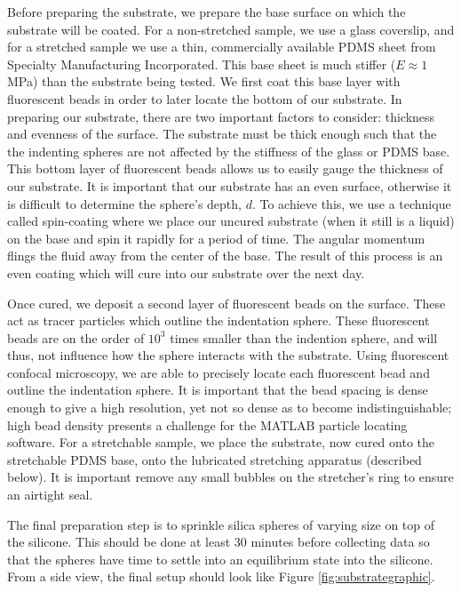 Before preparing the substrate, we prepare the base surface on which the substrate will be coated. For a non-stretched sample, we use a glass coverslip, and for a stretched sample we use a thin, commercially available PDMS sheet from Specialty Manufacturing Incorporated. This base sheet is much stiffer ($ E\approx 1 $ MPa) than the substrate being tested. We first coat this base layer with fluorescent beads in order to later locate the bottom of our substrate. In preparing our substrate, there are two important factors to consider: thickness and evenness of the surface. The substrate must be thick enough such that the the indenting spheres are not affected by the stiffness of the glass or PDMS base. This bottom layer of fluorescent beads allows us to easily gauge the thickness of our substrate. It is important that our substrate has an even surface, otherwise it is difficult to determine the sphere's depth, $ d $. To achieve this, we use a technique called spin-coating where we place our uncured substrate (when it still is a liquid) on the base and spin it rapidly for a period of time. The angular momentum  flings the fluid away from the center of the base. The result of this process is an even coating which will cure into our substrate over the next day.

Once cured, we deposit a second layer of fluorescent beads on the surface. These act as tracer particles which outline the indentation sphere. These fluorescent beads are on the order of $ 10^3 $ times smaller than the indention sphere, and will thus, not influence how the sphere interacts with the substrate. Using fluorescent confocal microscopy, we are able to precisely locate each fluorescent bead and outline the indentation sphere. It is important that the bead spacing is dense enough to give a high resolution, yet not so dense as to become indistinguishable; high bead density presents a challenge for the MATLAB particle locating software. For a stretchable sample, we place the substrate, now cured onto the stretchable PDMS base, onto the lubricated stretching apparatus (described below). It is important remove any small bubbles on the stretcher's ring to ensure an airtight seal. 

The final preparation step is to sprinkle silica spheres of varying size on top of the silicone. This should be done at least 30 minutes before collecting data so that the spheres have time to settle into an equilibrium state into the silicone. From a side view, the final setup should look like Figure \ref{fig:substrategraphic}.

